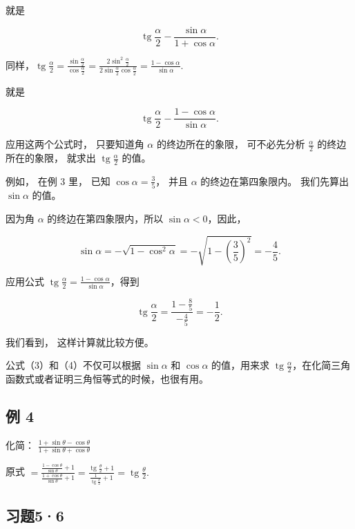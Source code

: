 就是

\[
\operatorname{tg} \frac {\alpha}{2} - \frac {\sin \alpha}{1 + \cos \alpha}. \tag {3}
\]

同样，\(\operatorname{tg} \frac{\alpha}{2} = \frac{\sin \frac{\alpha}{2}}{\cos \frac{\alpha}{2}} = \frac{2 \sin^2 \frac{\alpha}{2}}{2 \sin \frac{\alpha}{2} \cos \frac{\alpha}{2}} = \frac{1 - \cos \alpha}{\sin \alpha}\).

就是

\[
\operatorname{tg} \frac {\alpha}{2} - \frac {1 - \cos \alpha}{\sin \alpha}. \tag {4}
\]

应用这两个公式时， 只要知道角 \(\alpha\) 的终边所在的象限， 可不必先分析
\(\frac{\alpha}{2}\) 的终边所在的象限， 就求出
\(\operatorname{tg} \frac{\alpha}{2}\) 的值。

例如， 在例 3 里， 已知 \(\cos \alpha = \frac{3}{5}\)， 并且 \(\alpha\)
的终边在第四象限内。 我们先算出 \(\sin \alpha\) 的值。

因为角 \(\alpha\) 的终边在第四象限内，所以 \(\sin \alpha < 0\)，因此，

\[
\sin \alpha = - \sqrt {1 - \cos^ {2} \alpha} = - \sqrt {1 - \left(\frac {3}{5}\right) ^ {2}} = - \frac {4}{5}.
\]

应用公式
\(\operatorname{tg} \frac{\alpha}{2} = \frac{1 - \cos \alpha}{\sin \alpha}\)，得到

\[
\operatorname{tg} \frac {\alpha}{2} = \frac {1 - \frac {8}{5}}{- \frac {4}{5}} = - \frac {1}{2}.
\]

我们看到， 这样计算就比较方便。

公式（3）和（4）不仅可以根据 \(\sin \alpha\) 和 \(\cos \alpha\)
的值，用来求
\(\operatorname{tg} \frac{\alpha}{2}\)，在化简三角函数式或者证明三角恒等式的时候，也很有用。

\subsection{例 4}

化简：
\(\frac{1 + \sin\theta - \cos\theta}{1 + \sin\theta + \cos\theta}\)

 原式
\(= \frac{\frac{1 - \cos\theta}{\sin\theta} + 1}{\frac{1 + \cos\theta}{\sin\theta} + 1} = \frac{\operatorname{tg}\frac{\theta}{2} + 1}{\frac{1}{\operatorname{tg}\frac{\theta}{2}} + 1} = \operatorname{tg}\frac{\theta}{2}.\)

\subsection{习题5·6}

